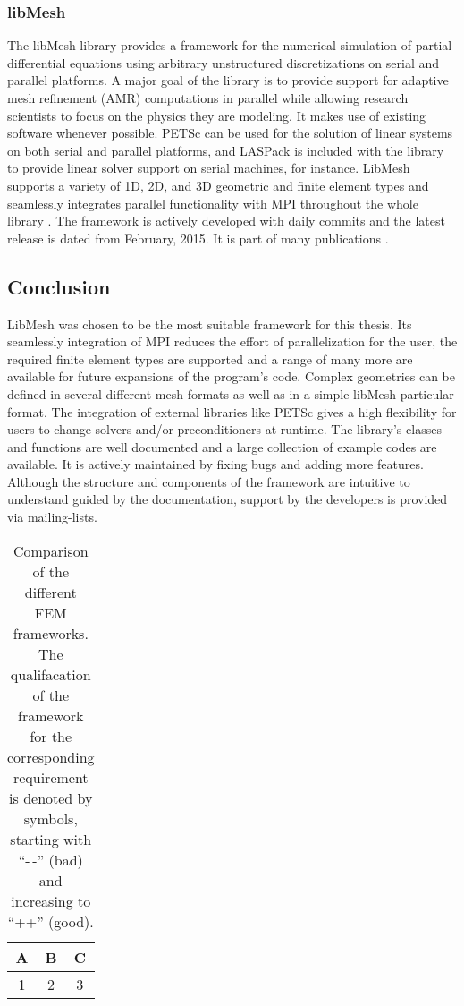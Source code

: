   
  
  
  \subsubsection{libMesh}
  The libMesh library provides a framework for the numerical simulation of partial differential equations using arbitrary unstructured discretizations on serial and parallel platforms. A major goal of the library is to provide support for adaptive mesh refinement (AMR) computations in parallel while allowing research scientists to focus on the physics they are modeling. It makes use of existing software whenever possible. PETSc can be used for the solution of linear systems on both serial and parallel platforms, and LASPack \cite{laspack2015url} is included with the library to provide linear solver support on serial machines, for instance. LibMesh supports a variety of 1D, 2D, and 3D geometric and finite element types and seamlessly integrates parallel functionality with MPI throughout the whole library \cite{kirk2006libmesh}. The framework is actively developed with daily commits and the latest release is dated from February, 2015. It is part of many publications \cite{libmeshPubs}.
  
  \subsection{Conclusion}
  LibMesh was chosen to be the most suitable framework for this thesis. Its seamlessly integration of MPI reduces the effort of parallelization for the user, the required finite element types are supported and a range of many more are available for future expansions of the program's code. Complex geometries can be defined in several different mesh formats as well as in a simple libMesh particular format. The integration of external libraries like PETSc gives a high flexibility for users to change solvers and/or preconditioners at runtime. The library's classes and functions are well documented and a large collection of example codes are available. It is actively maintained by fixing bugs and adding more features. Although the structure and components of the framework are intuitive to understand guided by the documentation, support by the developers is provided via mailing-lists.
  
  \begin{landscape}
  	\begin{table}
  		\centering
  		\begin{tabular}{|c|c|c|}
  			A & B & C\\\hline
  			1 & 2 & 3\\\hline\hline
  		\end{tabular}
  	\caption{Comparison of the different FEM frameworks. The qualifacation of the framework for the corresponding requirement is denoted by symbols, starting with ``-\,-'' (bad) and increasing to ``++'' (good).}
  \end{table}
  \end{landscape}
  
  
\newpage